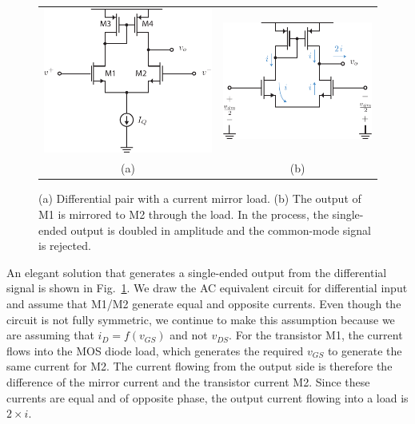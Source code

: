 \begin{figure}[tb]
\begin{center}
\begin{tabular}{cc}
\includegraphics[scale=1]{Diffpair_se_output.pdf} &
\includegraphics[scale=1]{Diffpair_se_ac.pdf}\\
(a) & (b) \\
\end{tabular}
\end{center}
\caption{(a) Differential pair with a current mirror load.  (b) The output of M1 is mirrored to M2 through the load. In the process, the single-ended output is doubled in amplitude and the common-mode signal is rejected.} \label{fig:Diffpair_se_output.pdf}
\end{figure}


An elegant solution that generates a single-ended output from the differential signal is shown in Fig.~\ref{fig:Diffpair_se_output.pdf}.  We draw the AC equivalent circuit for differential input and assume that M1/M2 generate equal and opposite currents.  Even though the circuit is not fully symmetric, we continue to make this assumption because we are assuming that $i_D = f(v_{GS})$ and not $v_{DS}$.  For the transistor M1, the current flows into the MOS diode load, which generates the required $v_{GS}$ to generate the same current for M2.  The current flowing from the output side is therefore the difference of the mirror current and the transistor current M2.  Since these currents are equal and of opposite phase, the output current flowing into a load is $2\times i$. 



